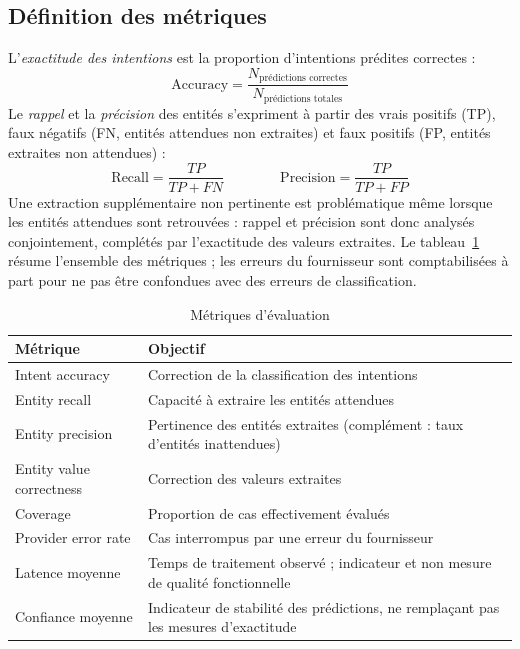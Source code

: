 \documentclass[11pt,a4paper,openany,oneside]{report}
\begin{document}
\subsection{Définition des métriques}\label{sec:metriques}
L'\emph{exactitude des intentions} est la proportion d'intentions prédites correctes :
\begin{equation}
\text{Accuracy}=\frac{N_{\text{prédictions correctes}}}{N_{\text{prédictions totales}}}
\end{equation}
Le \emph{rappel} et la \emph{précision} des entités s'expriment à partir des vrais positifs (TP), faux négatifs (FN, entités attendues non extraites) et faux positifs (FP, entités extraites non attendues) :
\begin{equation}
\text{Recall}=\frac{TP}{TP+FN}\qquad\qquad \text{Precision}=\frac{TP}{TP+FP}
\end{equation}
Une extraction supplémentaire non pertinente est problématique même lorsque les entités attendues sont retrouvées : rappel et précision sont donc analysés conjointement, complétés par l'exactitude des valeurs extraites. Le tableau~\ref{tab:metriques} résume l'ensemble des métriques ; les erreurs du fournisseur sont comptabilisées à part pour ne pas être confondues avec des erreurs de classification.

\begin{table}[htbp]
\centering\small
\caption{Métriques d'évaluation}\label{tab:metriques}
\begin{tabularx}{\textwidth}{@{}p{4cm}X@{}}
\toprule
\textbf{Métrique} & \textbf{Objectif} \\
\midrule
Intent accuracy & Correction de la classification des intentions \\
Entity recall & Capacité à extraire les entités attendues \\
Entity precision & Pertinence des entités extraites (complément : taux d'entités inattendues) \\
Entity value correctness & Correction des valeurs extraites \\
Coverage & Proportion de cas effectivement évalués \\
Provider error rate & Cas interrompus par une erreur du fournisseur \\
Latence moyenne & Temps de traitement observé ; indicateur et non mesure de qualité fonctionnelle \\
Confiance moyenne & Indicateur de stabilité des prédictions, ne remplaçant pas les mesures d'exactitude \\
\bottomrule
\end{tabularx}
\end{table}
\end{document}
